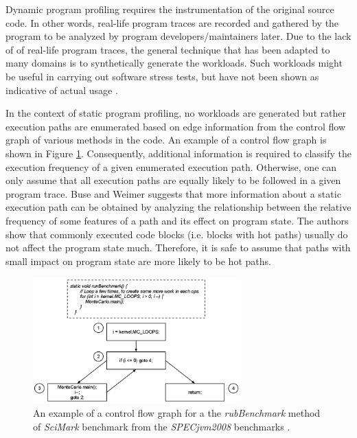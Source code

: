 \documentclass[10pt,twocolumn,letterpaper]{article}
\begin{document}
Dynamic program profiling requires the instrumentation of the original source code. In other words, real-life program traces are recorded and gathered by
the program to be analyzed by program developers/maintainers later. Due to the lack of of real-life program traces, the general technique that has been adapted
to many domains \cite{krishnamurthy2006synthetic, van2008generating, casale2010automatically, sen2007concolic, sen2006cute} is to synthetically generate the
workloads. Such workloads might be useful in carrying out software stress tests, but have not been shown as indicative of actual usage \cite{buse2009road}.

In the context of static program profiling, no workloads are generated but rather execution paths are enumerated based on edge information from the
control flow graph of various methods in the code. An example of a control flow graph is shown in Figure \ref{fig:cfg}. Consequently, additional information
is required to classify the execution frequency of a given enumerated execution path. Otherwise, one can only assume that all execution paths are equally likely
to be followed in a given program trace. Buse and Weimer \cite{buse2009road} suggests that more information about a static execution path can be obtained by
analyzing the relationship between the relative frequency of some features of a path and its effect on program state. The authors show that commonly executed
code blocks (i.e. blocks with hot paths) usually do not affect the program state much. Therefore, it is safe to assume that paths with small impact on program
state are more likely to be hot paths. 

\begin{figure}[t!]
\centering
\includegraphics[width=8cm]{imgs/cfg.png}
\caption{An example of a control flow graph for a the \textit{rubBenchmark} method of \textit{SciMark} benchmark from the \textit{SPECjvm2008} benchmarks
\cite{specjvm2008}.}
\label{fig:cfg}
\end{figure}
\end{document}
